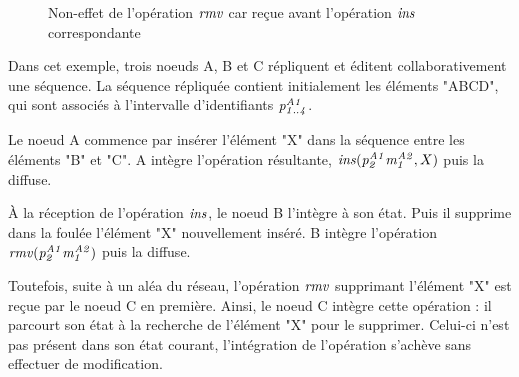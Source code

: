 \begin{figure}[!ht]
{
  }
  \caption{Non-effet de l'opération $\mathit{rmv}$ car reçue avant l'opération $\mathit{ins}$ correspondante}
  \label{fig:why-causal-remove}
\end{figure}

Dans cet exemple, trois noeuds A, B et C répliquent et éditent collaborativement une séquence.
La séquence répliquée contient initialement les éléments "ABCD", qui sont associés à l'intervalle d'identifiants $\mathit{p}^{\mathit{A1}}_{\mathit{1..4}}$.

Le noeud A commence par insérer l'élément "X" dans la séquence entre les éléments "B" et "C".
A intègre l'opération résultante, $\mathit{ins}(\mathit{p}^{\mathit{A1}}_{\mathit{2}}\mathit{m}^{\mathit{A2}}_{\mathit{1}},X)$ puis la diffuse.

À la réception de l'opération $\mathit{ins}$, le noeud B l'intègre à son état.
Puis il supprime dans la foulée l'élément "X" nouvellement inséré.
B intègre l'opération $\mathit{rmv}(\mathit{p}^{\mathit{A1}}_{\mathit{2}}\mathit{m}^{\mathit{A2}}_{\mathit{1}})$ puis la diffuse.

Toutefois, suite à un aléa du réseau, l'opération $\mathit{rmv}$ supprimant l'élément "X" est reçue par le noeud C en première.
Ainsi, le noeud C intègre cette opération : il parcourt son état à la recherche de l'élément "X" pour le supprimer.
Celui-ci n'est pas présent dans son état courant, l'intégration de l'opération s'achève sans effectuer de modification.

